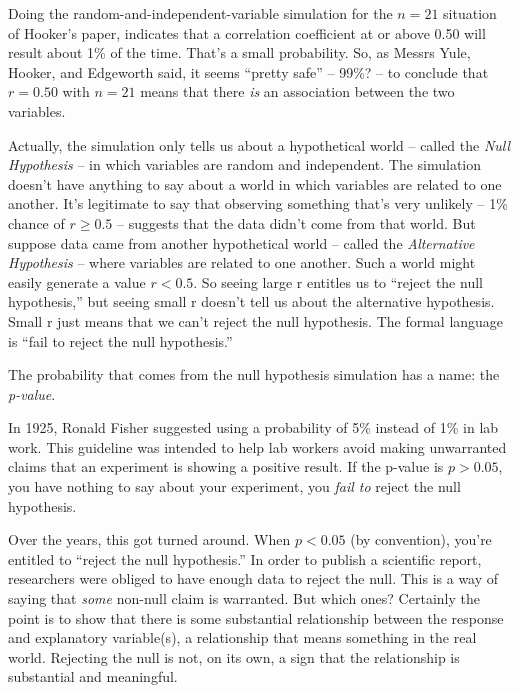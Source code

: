 \documentclass[]{book}
\begin{document}
Doing the random-and-independent-variable simulation for the \(n = 21\) situation of Hooker's paper, indicates that a correlation coefficient at or above 0.50 will result about 1\% of the time. That's a small probability. So, as Messrs Yule, Hooker, and Edgeworth said, it seems ``pretty safe'' -- 99\%? -- to conclude that \(r = 0.50\) with \(n=21\) means that there \emph{is} an association between the two variables.

Actually, the simulation only tells us about a hypothetical world -- called the \emph{Null Hypothesis} -- in which variables are random and independent. The simulation doesn't have anything to say about a world in which variables are related to one another. It's legitimate to say that observing something that's very unlikely -- 1\% chance of \(r \ge 0.5\) -- suggests that the data didn't come from that world. But suppose data came from another hypothetical world -- called the \emph{Alternative Hypothesis} -- where variables are related to one another. Such a world might easily generate a value \(r < 0.5\). So seeing large r entitles us to ``reject the null hypothesis,'' but seeing small r doesn't tell us about the alternative hypothesis. Small r just means that we can't reject the null hypothesis. The formal language is ``fail to reject the null hypothesis.''

The probability that comes from the null hypothesis simulation has a name: the \emph{p-value}.

In 1925, Ronald Fisher suggested using a probability of 5\% instead of 1\% in lab work. This guideline was intended to help lab workers avoid making unwarranted claims that an experiment is showing a positive result. If the p-value is \(p > 0.05\), you have nothing to say about your experiment, you \emph{fail to} reject the null hypothesis.

Over the years, this got turned around. When \(p < 0.05\) (by convention), you're entitled to ``reject the null hypothesis.'' In order to publish a scientific report, researchers were obliged to have enough data to reject the null. This is a way of saying that \emph{some} non-null claim is warranted. But which ones? Certainly the point is to show that there is some substantial relationship between the response and explanatory variable(s), a relationship that means something in the real world. Rejecting the null is not, on its own, a sign that the relationship is substantial and meaningful.
\end{document}
